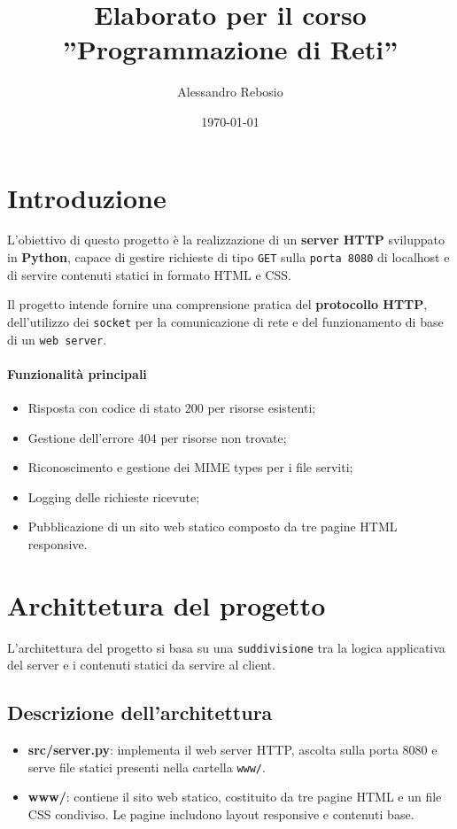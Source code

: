 \documentclass[a4paper,12pt]{report}
\title{Elaborato per il corso\\''Programmazione di Reti''}
\author{Alessandro Rebosio}
\date{\today}
\begin{document}
\maketitle

\tableofcontents

\chapter{Introduzione}

L'obiettivo di questo progetto è la realizzazione di un \textbf{server HTTP} \newline sviluppato in \textbf{Python},
capace di gestire richieste di tipo \texttt{GET} sulla \texttt{porta 8080} di localhost e di servire contenuti statici
in formato HTML e CSS.

\vspace{0.5cm}

\noindent Il progetto intende fornire una comprensione pratica del \textbf{protocollo \newline HTTP}, dell'utilizzo dei \texttt{socket}
per la comunicazione di rete e del funzionamento di base di un \texttt{web server}.

\subsubsection{Funzionalità principali}
\begin{itemize}
	\item Risposta con codice di stato 200 per risorse esistenti;
	\item Gestione dell'errore 404 per risorse non trovate;
	\item Riconoscimento e gestione dei MIME types per i file serviti;
	\item Logging delle richieste ricevute;
	\item Pubblicazione di un sito web statico composto da tre pagine HTML responsive.
\end{itemize}


\chapter{Archittetura del progetto}
L'architettura del progetto si basa su una \texttt{suddivisione} tra la logica \newline applicativa del server e i
contenuti statici da servire al client.

\section{Descrizione dell'architettura}
\begin{itemize}
	\item \textbf{src/server.py}: implementa il web server HTTP, ascolta sulla porta 8080 e serve file
	      statici presenti nella cartella \texttt{www/}.
	\item \textbf{www/}: contiene il sito web statico, costituito da tre pagine HTML e un file CSS
	      condiviso. Le pagine includono layout responsive e contenuti base.
\end{itemize}
\end{document}
